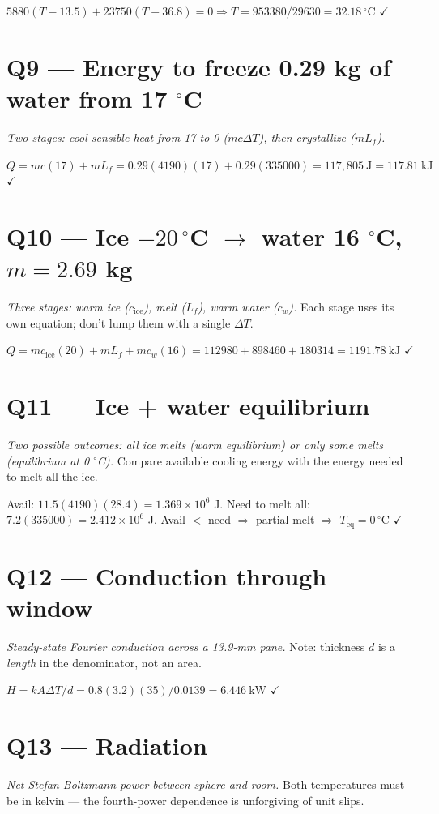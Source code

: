 \documentclass[11pt]{article}
\newcommand{\checkmk}{\ensuremath{\checkmark}}
\begin{document}
$5880(T-13.5) + 23750(T-36.8) = 0 \Rightarrow T = 953380/29630 = \boxed{32.18\,^\circ\text{C}}$ \checkmk

\section*{Q9 --- Energy to freeze 0.29 kg of water from 17 $^\circ$C}
\emph{Two stages: cool sensible-heat from 17 to 0 ($mc\Delta T$), then crystallize ($mL_f$).}

$Q = mc(17) + mL_f = 0.29(4190)(17) + 0.29(335000) = 117{,}805\ \text{J} = \boxed{117.81\ \text{kJ}}$ \checkmk

\section*{Q10 --- Ice $-20\,^\circ$C $\to$ water 16 $^\circ$C, $m=2.69$ kg}
\emph{Three stages: warm ice ($c_{\text{ice}}$), melt ($L_f$), warm water ($c_w$).} Each stage uses its own equation; don't lump them with a single $\Delta T$.

$Q = mc_{\text{ice}}(20) + mL_f + mc_w(16) = 112980 + 898460 + 180314 = \boxed{1191.78\ \text{kJ}}$ \checkmk

\section*{Q11 --- Ice + water equilibrium}
\emph{Two possible outcomes: all ice melts (warm equilibrium) or only some melts (equilibrium at 0 $^\circ$C).} Compare available cooling energy with the energy needed to melt all the ice.

Avail: $11.5(4190)(28.4) = 1.369\times10^6$ J. Need to melt all: $7.2(335000) = 2.412\times10^6$ J. Avail $<$ need $\Rightarrow$ partial melt $\Rightarrow$ $\boxed{T_{\text{eq}} = 0\,^\circ\text{C}}$ \checkmk

\section*{Q12 --- Conduction through window}
\emph{Steady-state Fourier conduction across a 13.9-mm pane.} Note: thickness $d$ is a \emph{length} in the denominator, not an area.

$H = kA\Delta T/d = 0.8(3.2)(35)/0.0139 = \boxed{6.446\ \text{kW}}$ \checkmk

\section*{Q13 --- Radiation}
\emph{Net Stefan-Boltzmann power between sphere and room.} Both temperatures must be in kelvin --- the fourth-power dependence is unforgiving of unit slips.
\end{document}
